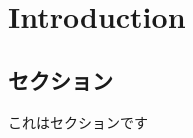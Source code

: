 \documentclass[../main.tex]{subfiles}
\begin{document}
\chapter{Introduction}

\section{セクション}
これはセクションです

\blindtext
\end{document}
